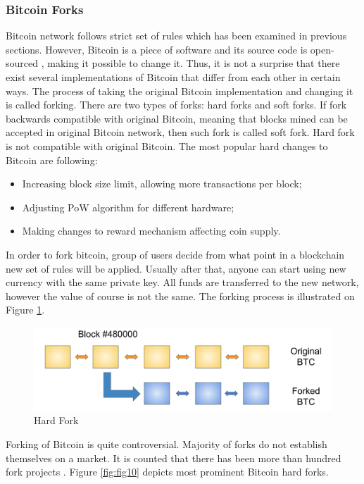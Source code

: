 \documentclass[conference,compsoc]{IEEEtran}
\begin{document}
\subsubsection{Bitcoin Forks}
Bitcoin network follows strict set of rules which has been examined in previous sections.
However, Bitcoin is a piece of software and its source code is open-sourced \cite{core}, making it possible to change it. 
Thus, it is not a surprise that there exist several implementations of Bitcoin that differ from each other in certain ways.
The process of taking the original Bitcoin implementation and changing it is called forking. 
There are two types of forks: hard forks and soft forks. 
If fork backwards compatible with original Bitcoin, meaning that blocks mined can be accepted in original Bitcoin network, then such fork is called soft fork. 
Hard fork is not compatible with original Bitcoin. 
The most popular hard changes to Bitcoin are following:

\begin{itemize}
    \item Increasing block size limit, allowing more transactions per block;
    \item Adjusting PoW algorithm for different hardware;
    \item Making changes to reward mechanism affecting coin supply.
\end{itemize}

In order to fork bitcoin, group of users decide from what point in a blockchain new set of rules will be applied. 
Usually after that, anyone can start using new currency with the same private key. 
All funds are transferred to the new network, however the value of course is not the same. 
The forking process is illustrated on Figure \ref{fig:fig9}.

\begin{figure}[h]
  \centering
  \includegraphics[width=.45\textwidth]{graphics/fork.png}
  \caption{Hard Fork}
  \label{fig:fig9}
\end{figure}

Forking of Bitcoin is quite controversial. 
Majority of forks do not establish themselves on a market. 
It is counted that there has been more than hundred fork projects \cite{forks}.
Figure \ref{fig:fig10} depicts most prominent Bitcoin hard forks. 
\end{document}
